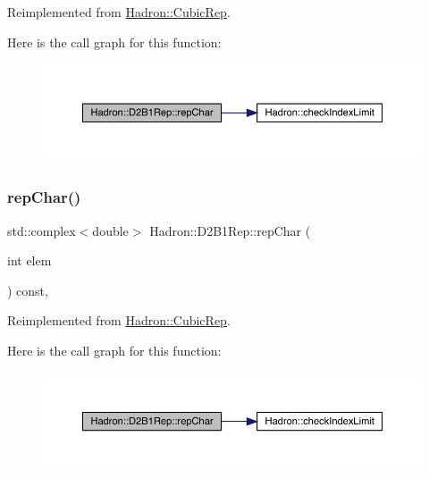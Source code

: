 Reimplemented from \mbox{\hyperlink{structHadron_1_1CubicRep_af45227106e8e715e84b0af69cd3b36f8}{Hadron\+::\+Cubic\+Rep}}.

Here is the call graph for this function\+:
\nopagebreak
\begin{figure}[H]
\begin{center}
\leavevmode
\includegraphics[width=350pt]{d1/d67/structHadron_1_1D2B1Rep_a306ddfcdbe8144f7f602a2814810cc7f_cgraph}
\end{center}
\end{figure}
\mbox{\label{structHadron_1_1D2B1Rep_a306ddfcdbe8144f7f602a2814810cc7f}} 
\subsubsection{\texorpdfstring{repChar()}{repChar()}\hspace{0.1cm}{\footnotesize\ttfamily [3/3]}}
{\footnotesize\ttfamily std\+::complex$<$double$>$ Hadron\+::\+D2\+B1\+Rep\+::rep\+Char (\begin{DoxyParamCaption}\item[{int}]{elem }\end{DoxyParamCaption}) const\hspace{0.3cm}{\ttfamily [inline]}, {\ttfamily [virtual]}}



Reimplemented from \mbox{\hyperlink{structHadron_1_1CubicRep_af45227106e8e715e84b0af69cd3b36f8}{Hadron\+::\+Cubic\+Rep}}.

Here is the call graph for this function\+:
\nopagebreak
\begin{figure}[H]
\begin{center}
\leavevmode
\includegraphics[width=350pt]{d1/d67/structHadron_1_1D2B1Rep_a306ddfcdbe8144f7f602a2814810cc7f_cgraph}
\end{center}
\end{figure}
\mbox{\label{structHadron_1_1D2B1Rep_a3d7f68800d29238030406bf06553360f}} 
